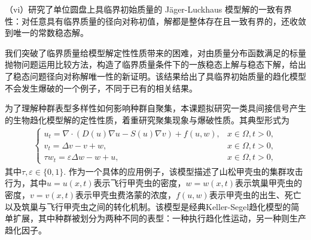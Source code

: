 \documentclass[12pt]{article}
\begin{document}
（vi）研究了单位圆盘上具临界初始质量的 J\"ager-Luckhaus 模型解的一致有界性：对任意具有临界质量的径向对称初值，解都是整体存在且一致有界的，还收敛到唯一的常数稳态解。

我们突破了临界质量给模型解定性性质带来的困难，对由质量分布函数满足的标量抛物问题运用比较方法，构造了临界质量条件下的一族稳态上解与稳态下解，给出了稳态问题径向对称解唯一性的新证明。该结果给出了具临界初始质量的趋化模型不会发生爆破的一个例子，不同于已有的相关结果。





为了理解种群表型多样性如何影响种群自聚集，本课题拟研究一类具间接信号产生的生物趋化模型解的定性性质，着重研究聚集现象与爆破性质。其典型形式为
\begin{align}
    \begin{cases}
      \label{sys: ks isp pppf}
        u_t =  \nabla\cdot(D(u)\nabla u - S(u)\nabla v) + f(u,w),& x\in\Omega, t>0,\\
        v_t =  \Delta v - v + w,& x\in\Omega,	 t>0,\\
        \tau w_t  = \varepsilon\Delta w - w + u, & x\in\Omega, t > 0, 
    \end{cases}
\end{align}
其中$\tau,\varepsilon\in\{0,1\}$. 作为一个具体的应用例子，该模型描述了山松甲壳虫的集群攻击行为，其中$u=u(x,t)$表示飞行甲壳虫的密度，$w=w(x,t)$表示筑巢甲壳虫的密度，$v=v(x,t)$表示甲壳虫费洛蒙的浓度，$f(u,w)$表示甲壳虫的出生、死亡以及筑巢与飞行甲壳虫之间的转化机制。该模型是经典Keller-Segel趋化模型的简单扩展，其中种群被划分为两种不同的表型：一种执行趋化性运动，另一种则生产趋化因子。
\end{document}
